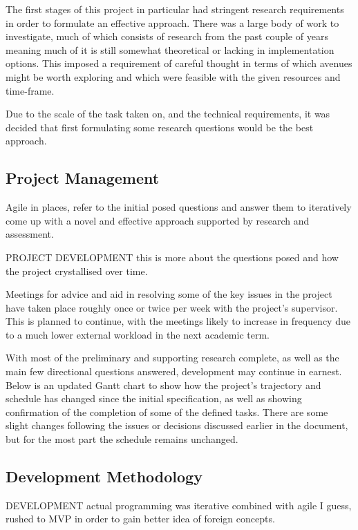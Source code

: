\documentclass[12pt,]{article}
\begin{document}
The first stages of this project in particular had stringent research
requirements in order to formulate an effective approach. There was a
large body of work to investigate, much of which consists of research
from the past couple of years meaning much of it is still somewhat
theoretical or lacking in implementation options. This imposed a
requirement of careful thought in terms of which avenues might be worth
exploring and which were feasible with the given resources and
time-frame.

Due to the scale of the task taken on, and the technical requirements,
it was decided that first formulating some research questions would be
the best approach.

\hypertarget{project-management}{%
\subsection{Project Management}\label{project-management}}

Agile in places, refer to the initial posed questions and answer them to
iteratively come up with a novel and effective approach supported by
research and assessment.

PROJECT DEVELOPMENT this is more about the questions posed and how the
project crystallised over time.

Meetings for advice and aid in resolving some of the key issues in the
project have taken place roughly once or twice per week with the
project's supervisor. This is planned to continue, with the meetings
likely to increase in frequency due to a much lower external workload in
the next academic term.

With most of the preliminary and supporting research complete, as well
as the main few directional questions answered, development may continue
in earnest. Below is an updated Gantt chart to show how the project's
trajectory and schedule has changed since the initial specification, as
well as showing confirmation of the completion of some of the defined
tasks. There are some slight changes following the issues or decisions
discussed earlier in the document, but for the most part the schedule
remains unchanged.

\hypertarget{development-methodology}{%
\subsection{Development Methodology}\label{development-methodology}}

DEVELOPMENT actual programming was iterative combined with agile I
guess, rushed to MVP in order to gain better idea of foreign concepts.
\end{document}
